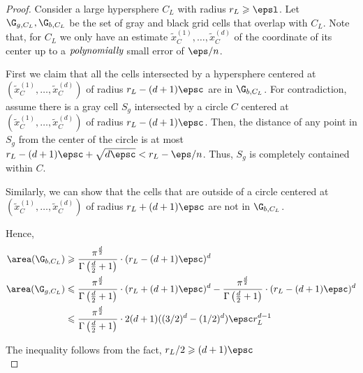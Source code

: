 	\begin{proof}
		Consider a large hypersphere \(C_L\) with radius \(r_L\geqslant\epsl\). Let \(\G_{g, C_L},\G_{b, C_L}\) be the set of gray and black grid cells that overlap with \(C_L\). Note that, for \(C_L\) we only have an estimate \(\tilde{x}_{C}^{(1)},\dots,\tilde{x}_{C}^{(d)}\) of the coordinate of its center up to a \(\emph{polynomially}\) small error of \(\eps/n\).
		
		First we claim that all the cells intersected by a hypersphere centered at  \((\tilde{x}_{C}^{(1)},\dots,\tilde{x}_{C}^{(d)})\) of radius $r_L- (d+1)\epsc$ are in $\G_{b, C_L}$. 
		For contradiction, assume there is a gray cell $S_g$ intersected by a circle $C$ centered at  \((\tilde{x}_{C}^{(1)},\dots,\tilde{x}_{C}^{(d)})\) of radius $r_L- (d+1)\epsc$.
		Then, the distance of any point in $S_g$ from the center of the circle is at most $r_L- (d+1)\epsc +\sqrt{d\epsc} < r_L-\eps/n$. Thus, $S_g$  is completely contained within $C$.
		
		Similarly, we can show that the cells that are outside of a circle centered at  \((\tilde{x}_{C}^{(1)},\dots,\tilde{x}_{C}^{(d)})\) of radius $r_L+ (d+1)\epsc$ are not in $\G_{b, C_L}$.
		
		Hence, 
		\begin{align*}
		\area(\G_{b, C_L}) &\geqslant \frac{\pi^{\frac{d}{2}}}{\Gamma\left(\frac{d}{2} + 1\right)} \cdot (r_L-(d+1)\epsc)^d \\
		\area(\G_{g, C_L}) &\leqslant \frac{\pi^{\frac{d}{2}}}{\Gamma\left(\frac{d}{2} + 1\right)} \cdot (r_L+(d+1)\epsc)^d - \frac{\pi^{\frac{d}{2}}}{\Gamma\left(\frac{d}{2} + 1\right)} \cdot (r_L-(d+1)\epsc)^d \\ 
		&\leqslant \frac{\pi^{\frac{d}{2}}}{\Gamma\left(\frac{d}{2} + 1\right)} \cdot 2(d+1)((3/2)^d-(1/2)^d)\epsc r_{L}^{d-1}
		\end{align*}

		The inequality follows from the fact, \(r_{L}/2\geqslant(d+1)\epsc\)\\
		

\end{proof}
